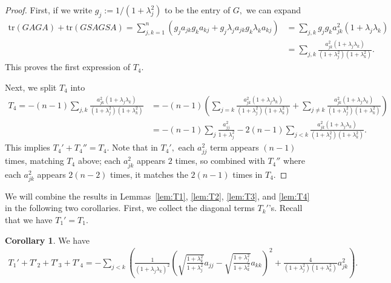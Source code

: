 \documentclass[11pt]{amsart}
\numberwithin{equation}{section}
\theoremstyle{definition}
\theoremstyle{definition}
\newtheorem{cor}[equation]{Corollary}
\newcommand{\pr}[1]{\left(#1\right)}
\newcommand{\tr}{\text{tr}}
\begin{document}
\begin{proof}
	First, if we write $g_j:=1/(1+\lambda_j^2)$ to be the entry of $G,$ we can expand
	\begin{align*}
	\tr(GAGA) + \tr(GSAGSA)
	= \sum_{j,k=1}^n \pr{g_ja_{jk}g_ka_{kj} 
		+g_j\lambda_ja_{jk}g_k\lambda_k a_{kj}
	}
	& = \sum_{j,k} g_jg_ka_{jk}^2(1+\lambda_j\lambda_k)\\
	& = \sum_{j,k}
	\frac{a_{jk}^2\pr{1+\lambda_j\lambda_k}}{(1+\lambda_j^2)(1+\lambda_k^2)}.
	\end{align*}
	This proves the first expression of $T_4.$
	
	Next, we split $T_4$ into
	\begin{align*}
	T_4
	= -(n-1) \sum_{j,k}
	\frac{a_{jk}^2\pr{1+\lambda_j\lambda_k}}{(1+\lambda_j^2)(1+\lambda_k^2)}
	& = -(n-1) 
	\pr{\sum_{j=k}
		\frac{a_{jk}^2\pr{1+\lambda_j\lambda_k}}{(1+\lambda_j^2)(1+\lambda_k^2)}
		+ \sum_{j\neq k}
		\frac{a_{jk}^2\pr{1+\lambda_j\lambda_k}}{(1+\lambda_j^2)(1+\lambda_k^2)}}\\
	& = -(n-1)\sum_j \frac{a_{jj}^2}{1+\lambda_j^2}
	- 2(n-1) \sum_{j<k} \frac{a_{jk}^2\pr{1+\lambda_j\lambda_k}}{(1+\lambda_j^2)(1+\lambda_k^2)}.
	\end{align*}
	This implies $T_4'+T_4''=T_4.$
	Note that in $T_4',$ each $a_{jj}^2$ term appears $(n-1)$ times, matching $T_4$ above;
	each $a_{jk}^2$ appears $2$ times, so combined with $T_4''$ where each $a_{jk}^2$ appears $2(n-2)$ times, it matches the $2(n-1)$ times in $T_4.$
\end{proof}



We will combine the results in Lemmas~\ref{lem:T1}, \ref{lem:T2}, \ref{lem:T3}, and \ref{lem:T4} in the following two corollaries.
First, we collect the diagonal terms $T_k'$'s.
Recall that we have $T_1'=T_1.$

\begin{cor}
	\label{lem:diag-T}
	We have
	\begin{align*}
	T_1'+T'_2+T'_3+T'_4
	= - \sum_{j<k}
	\pr{\frac 1{\pr{1+\lambda_j\lambda_k}^2} 
		\pr{\sqrt{\frac{1+\lambda_k^2}{1+\lambda_j^2}}a_{jj} - \sqrt{\frac{1+\lambda_j^2}{1+\lambda_k^2}}a_{kk}}^2
		+\frac {4}{(1+\lambda_j^2)(1+\lambda_k^2)}a_{jk}^2}.
	\end{align*}
\end{cor}
\end{document}
